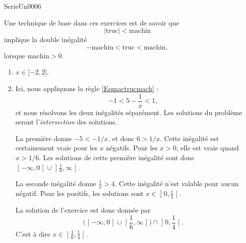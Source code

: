 \documentclass{article}
\begin{document}
\begin{corrige}{SerieUn0006}

	Une technique de base dans ces exercices est de savoir que
	\begin{equation}
		| \text{truc} |<\text{machin}
	\end{equation}
	implique la double inégalité
	\begin{equation}					\label{Eqmactrucmach}
		-\text{machin}<\text{truc}<\text{machin},
	\end{equation}
	lorsque $\text{machin}>0$.


	\begin{enumerate}

		\item
			$x\in\mathopen[ -2 , 2 \mathclose]$.
		\item
			Ici, nous appliquons la règle \eqref{Eqmactrucmach} :
			\begin{equation}
				-1<5-\frac{1}{ x }<1,
			\end{equation}
			et nous résolvons les deux inégalités séparément. Les solutions du problème seront l'\emph{intersection} des solutions. 

			La première donne $-5<-1/x$, et donc $6>1/x$. Cette inégalité est certainement vraie pour les $x$ négatifs. Pour les $x>0$, elle est vraie quand $x>1/6$. Les solutions de cette première inégalité sont donc $\mathopen] -\infty , 0 \mathclose[\cup\mathopen] \frac{1}{ 6 } , \infty \mathclose[$.

			La seconde inégalité donne $\frac{1}{ x }>4$. Cette inégalité n'est valable pour aucun négatif. Pour les positifs, les solutions sont $x\in\mathopen] 0 , \frac{1}{ 4 } \mathclose[$.

			La solution de l'exercice est donc donnée par
			\begin{equation}
				\Big(    \mathopen] -\infty , 0 \mathclose[\cup\mathopen] \frac{1}{ 6 } , \infty \mathclose[  \Big)\cap \mathopen] 0, \frac{1}{ 4 } \mathclose[.
			\end{equation}
			C'est à dire $x\in\mathopen] \frac{1}{ 6 } , \frac{1}{ 4 } \mathclose[$.



\end{enumerate}
\end{corrige}
\end{document}
